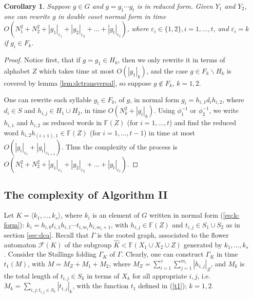 \documentclass[a4paper,12pt]{article}
\newcommand{\G}{\Gamma }
\newcommand{\e}{\varepsilon }
\newcommand{\cF}{{\cal{F}}}
\newtheorem{corollary}[theorem]{Corollary}
\numberwithin{equation}{section}
\numberwithin{figure}{section}
\newcommand{\FF}{\ensuremath{\mathbb{F}}}
\renewcommand{\cF}{\mathcal{F}}
\newcommand{\la}{\langle}
\newcommand{\ra}{\rangle}
\begin{document}
\begin{corollary}\label{cor:dcnf_time} Suppose $g \in G$ and $g=g_1 \cdots g_t$ is in reduced
form. Given $Y_1$ and $Y_2$, one can rewrite $g$ in double coset normal
form in time  $O(N^2_1+ N^2_2 + |g_1|_{\e_1}+|g_2|_{\e_2}+
\ldots +|g_t|_{\e_t})$, where $\e_i \in \{ 1, 2\}, i = 1, \ldots,
t$, and $\e_i = k$ if $g_i \in F_k$.
\end{corollary}

\begin{proof} Notice first, that if $g = g_1 \in H_k$, then we
only rewrite it in terms of alphabet $Z$ which takes time at most
$O(|g_1|_k)$, and the case $g \in F_k \smallsetminus H_k$ is
covered by lemma \ref{lem:dctransversal}, so suppose $g \notin
F_k$, $k=1,2$.

One can rewrite each syllable $g_i \in F_k$, of $g$, in normal form
$g_i=h_{i,1}d_ih_{i,2}$, where $d_i\in S$ and $h_{i,j}\in H_1\cup
H_2$, in time  $O(N^2_k + |g_i|_k)$. Using $\phi_1^{-1}$ or
$\phi_2^{-1}$, we write $h_{i,1}$ and $h_{i,2}$ as reduced words
in $\FF(Z)$ (for $i=1, \ldots, t$) and find the reduced word
$h_{i,2}h_{(i+1),1}\in \FF(Z)$ (for $i=1, \ldots, t-1$) in time at
most $O(|g_i|_{\e_i}+|g_i|_{\e_{i+1}})$.  Thus the
complexity of the process is $O(N^2_1+ N^2_2 +
|g_1|_{\e_1}+|g_2|_{\e_2}+ \ldots +|g_t|_{\e_t})$. \end{proof}


\subsection{The complexity of Algorithm II}\label{sub:resolution}

Let $K=\la k_1, \ldots , k_s\ra$, where $k_i$ is an element of $G$
written in normal form (\ref{eq:k-form}): $k_i=
h_{i,0}t_{i,1}h_{i,1}\cdots t_{i,m_i}h_{i,m_i+1}$, with
$h_{i,j}\in \FF(Z)$ and $t_{i,j}\in S_1\cup S_2$ as in section
\ref{sec:dca}. Recall that $\G$ is the rooted graph, associated to
the flower automaton $\cF(K)$ of the subgroup $\hat K < \FF(X_1\cup
X_2 \cup Z)$ generated by $k_1, \ldots , k_s$.
Consider the Stallings folding $\G_K$ of $\G$. Clearly, one can
construct $\G_K$ in time  $t_1(M)$, with $M = M_Z+M_1+M_2$,
 where $M_Z =
\mathop{\sum}\limits_{i=1}^{s}
\mathop{\sum}\limits_{j=1}^{m_i}|h_{i,j}|_Z$, and $M_k$ is the
total length of $t_{i,j} \in S_k$ in terms of $X_k$ for all
appropriate $i,j$, i.e. $M_k = \mathop{\sum}\limits_{i,j:
t_{i,j}\in S_k} |t_{i,j}|_k$, with the function $t_1$ defined in
(\ref{t1}); $k=1,2$.
\end{document}
